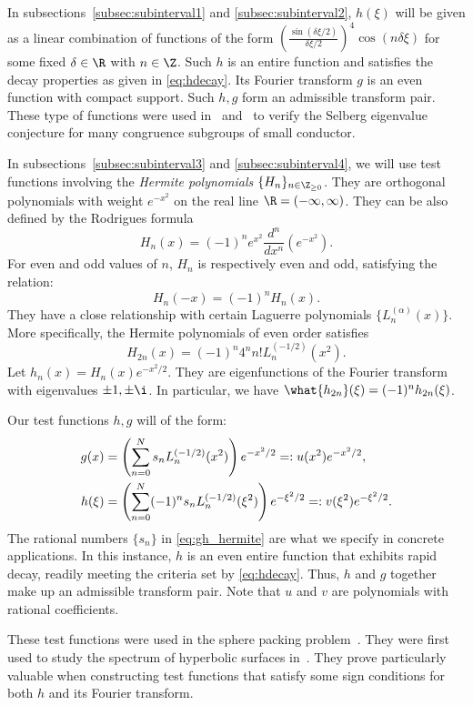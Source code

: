 In subsections~\ref{subsec:subinterval1} and \ref{subsec:subinterval2}, 
$h(\xi)$ will be given as a linear combination of functions of the form
$\left(\frac{\sin(\delta \xi / 2)}{\delta \xi / 2}\right)^{4}\cos(n \delta \xi)$ for some fixed $\delta\in \R$ with $n\in \Z$.
Such $h$ is an entire function and satisfies the decay properties as given in \eqref{eq:hdecay}.
Its Fourier transform $g$ is an even function with compact support.
Such $h,g$ form an admissible transform pair.
These type of functions were used in~\cite[Section 4]{MR2338122} and~\cite[Section 5]{MR4186122} to verify 
the Selberg eigenvalue conjecture for many congruence subgroups of small conductor.

In subsections~\ref{subsec:subinterval3} and \ref{subsec:subinterval4}, we will use test functions involving the \emph{Hermite polynomials} $\{H_n\}_{n\in \Z_{\geq 0}}$.
They are orthogonal polynomials with weight $e^{-x^2}$ on the real line $\R = (-\infty, \infty)$.
They can be also defined by the Rodrigues formula
\[
H_n(x) = (-1)^n e^{x^2} \frac{d^n}{dx^n}(e^{-x^2}).
\]
For even and odd values of \(n\), \(H_n\) is respectively even and odd, satisfying the relation:
\[
H_n(-x) = (-1)^n H_n(x).
\]
They have a close relationship with certain Laguerre polynomials $\{L_n^{(\alpha)}(x)\}$.
More specifically, the Hermite polynomials of even order satisfies
\[
H_{2n}(x) = (-1)^n 4^{n} n! L_n^{(-1/2)}(x^2).
\]
Let $h_n(x) = H_n(x) e^{-x^2/2}$.
They are eigenfunctions of the Fourier transform with eigenvalues $\pm 1, \pm \i$.
In particular, we have $\what{h_{2n}}(\xi) = (-1)^n h_{2n}(\xi)$.

Our test functions $h,g$ will of the form:
\begin{align}
g(x) &= \left(\sum_{n=0}^N s_n L_n^{(-1/2)}(x^2) \right) e^{-x^2/2} =: u(x^2) e^{-x^2/2}, \notag \\
h(\xi) &=  \left(\sum_{n=0}^N (-1)^n s_n L_n^{(-1/2)}(\xi^2) \right) e^{-\xi^2/2} =: v(\xi^2) e^{-\xi^2/2}. \label{eq:gh_hermite}
\end{align}
The rational numbers $\{s_n\}$ in \eqref{eq:gh_hermite} are what we specify in concrete applications.
In this instance, \( h \) is an even entire function that exhibits rapid decay, readily meeting the criteria set by \eqref{eq:hdecay}. 
Thus, \( h \) and \( g \) together make up an admissible transform pair.
Note that $u$ and $v$ are polynomials with rational coefficients.

These test functions were used in the sphere packing problem~\cite[Section 7]{MR1973059}.
They were first used to study the spectrum of hyperbolic surfaces in~\cite{FBP21}.
They prove particularly valuable when constructing test functions that satisfy some sign conditions for both $h$ and its Fourier transform.


